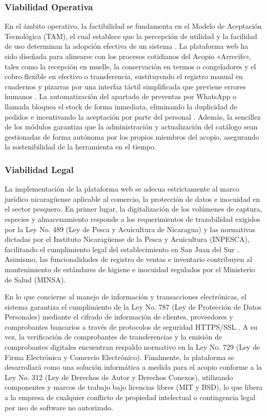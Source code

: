 \subsubsection{Viabilidad Operativa}

En el ámbito operativo, la factibilidad se fundamenta en el Modelo de Aceptación Tecnológica (TAM), el cual establece que la percepción de utilidad y la facilidad de uso determinan la adopción efectiva de un sistema \parencite{davis1989}. La plataforma web ha sido diseñada para alinearse con los procesos cotidianos del Acopio «Arrecife», tales como la recepción en muelle, la conservación en termos o congeladores y el cobro flexible en efectivo o transferencia, sustituyendo el registro manual en cuadernos y pizarras por una interfaz táctil simplificada que previene errores humanos \parencite{ahumada2020sistema}. La automatización del apartado de preventas por WhatsApp o llamada bloquea el stock de forma inmediata, eliminando la duplicidad de pedidos e incentivando la aceptación por parte del personal \parencite{villasmil2021}. Además, la sencillez de los módulos garantiza que la administración y actualización del catálogo sean gestionadas de forma autónoma por los propios miembros del acopio, asegurando la sostenibilidad de la herramienta en el tiempo.

\subsubsection{Viabilidad Legal}

La implementación de la plataforma web se adecua estrictamente al marco jurídico nicaragüense aplicable al comercio, la protección de datos e inocuidad en el sector pesquero. En primer lugar, la digitalización de los volúmenes de captura, especies y almacenamiento responde a los requerimientos de trazabilidad exigidos por la Ley No. 489 (Ley de Pesca y Acuicultura de Nicaragua) y las normativas dictadas por el Instituto Nicaragüense de la Pesca y Acuicultura (INPESCA), facilitando el cumplimiento legal del establecimiento en San Juan del Sur \parencite{republicaNicaragua2004}. Asimismo, las funcionalidades de registro de ventas e inventario contribuyen al mantenimiento de estándares de higiene e inocuidad regulados por el Ministerio de Salud (MINSA).

En lo que concierne al manejo de información y transacciones electrónicas, el sistema garantiza el cumplimiento de la Ley No. 787 (Ley de Protección de Datos Personales) mediante el cifrado de información de clientes, proveedores y comprobantes bancarios a través de protocolos de seguridad HTTPS/SSL \parencite{republicaNicaragua2012}. A su vez, la verificación de comprobantes de transferencias y la emisión de comprobantes digitales encuentran respaldo normativo en la Ley No. 729 (Ley de Firma Electrónica y Comercio Electrónico). Finalmente, la plataforma se desarrollará como una solución informática a medida para el acopio conforme a la Ley No. 312 (Ley de Derechos de Autor y Derechos Conexos), utilizando componentes y marcos de trabajo bajo licencias libres (MIT y BSD), lo que libera a la empresa de cualquier conflicto de propiedad intelectual o contingencia legal por uso de software no autorizado.
